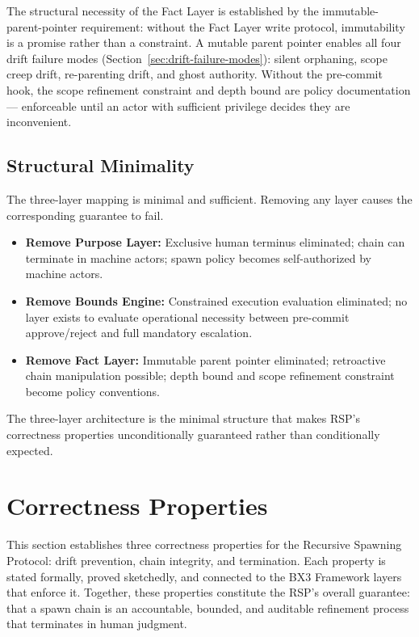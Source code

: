 The structural necessity of the Fact Layer is established by the immutable-parent-pointer requirement: without the Fact Layer write protocol, immutability is a promise rather than a constraint. A mutable parent pointer enables all four drift failure modes (Section~\ref{sec:drift-failure-modes}): silent orphaning, scope creep drift, re-parenting drift, and ghost authority. Without the pre-commit hook, the scope refinement constraint and depth bound are policy documentation — enforceable until an actor with sufficient privilege decides they are inconvenient.

\subsection{Structural Minimality}
\label{sec:rs-minimality}

The three-layer mapping is minimal and sufficient. Removing any layer causes the corresponding guarantee to fail.

\begin{itemize}
    \item \textbf{Remove Purpose Layer:} Exclusive human terminus eliminated; chain can terminate in machine actors; spawn policy becomes self-authorized by machine actors.
    \item \textbf{Remove Bounds Engine:} Constrained execution evaluation eliminated; no layer exists to evaluate operational necessity between pre-commit approve/reject and full mandatory escalation.
    \item \textbf{Remove Fact Layer:} Immutable parent pointer eliminated; retroactive chain manipulation possible; depth bound and scope refinement constraint become policy conventions.
\end{itemize}

The three-layer architecture is the minimal structure that makes RSP's correctness properties unconditionally guaranteed rather than conditionally expected.

\newpage
\section{Correctness Properties}
\label{sec:rs-correctness}

This section establishes three correctness properties for the Recursive Spawning Protocol: drift prevention, chain integrity, and termination. Each property is stated formally, proved sketchedly, and connected to the BX3 Framework layers that enforce it. Together, these properties constitute the RSP's overall guarantee: that a spawn chain is an accountable, bounded, and auditable refinement process that terminates in human judgment.

